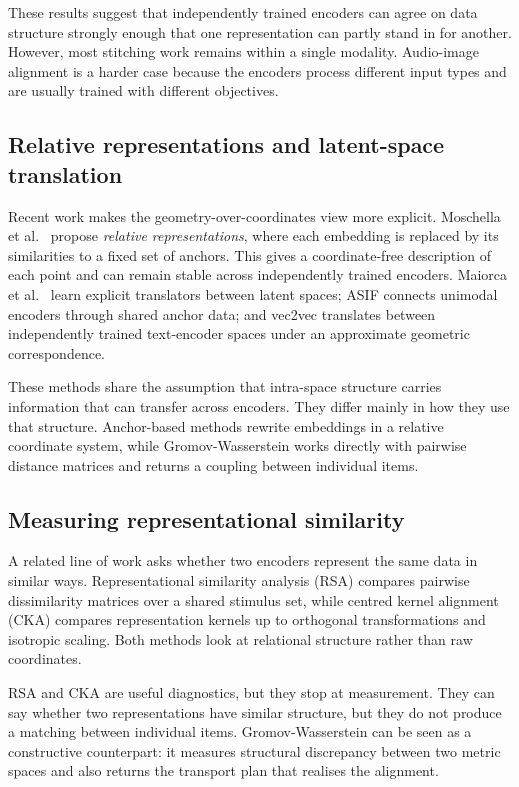 These results suggest that independently trained encoders can agree on data structure strongly enough that one representation can partly stand in for another. However, most stitching work remains within a single modality. Audio-image alignment is a harder case because the encoders process different input types and are usually trained with different objectives.

\subsection{Relative representations and latent-space translation}

Recent work makes the geometry-over-coordinates view more explicit. Moschella et al.\ \cite{moschella2023relative} propose \emph{relative representations}, where each embedding is replaced by its similarities to a fixed set of anchors. This gives a coordinate-free description of each point and can remain stable across independently trained encoders. Maiorca et al.\ \cite{maiorca2023latent} learn explicit translators between latent spaces; ASIF \cite{norelli2023asif} connects unimodal encoders through shared anchor data; and vec2vec \cite{jha2025vec2vec} translates between independently trained text-encoder spaces under an approximate geometric correspondence.

These methods share the assumption that intra-space structure carries information that can transfer across encoders. They differ mainly in how they use that structure. Anchor-based methods rewrite embeddings in a relative coordinate system, while Gromov-Wasserstein works directly with pairwise distance matrices and returns a coupling between individual items.

\subsection{Measuring representational similarity}

A related line of work asks whether two encoders represent the same data in similar ways. Representational similarity analysis (RSA) \cite{kriegeskorte2008rsa} compares pairwise dissimilarity matrices over a shared stimulus set, while centred kernel alignment (CKA) \cite{kornblith2019similarity} compares representation kernels up to orthogonal transformations and isotropic scaling. Both methods look at relational structure rather than raw coordinates.

RSA and CKA are useful diagnostics, but they stop at measurement. They can say whether two representations have similar structure, but they do not produce a matching between individual items. Gromov-Wasserstein can be seen as a constructive counterpart: it measures structural discrepancy between two metric spaces and also returns the transport plan that realises the alignment.

